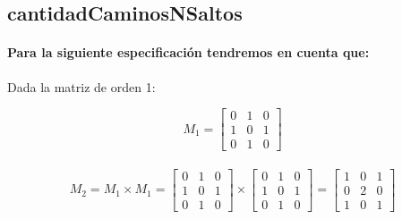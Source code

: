 \documentclass[10pt,a4paper]{article}
\begin{document}
\subsection{cantidadCaminosNSaltos}
\paragraph{Para la siguiente especificación tendremos en cuenta que:}{Dada la matriz de orden 1:}

\[
	M_{1} = \begin{bmatrix} 0 & 1 & 0 \\	1 & 0 & 1 \\	0 & 1 & 0 \end{bmatrix} \]
\\
\[
	M_{2} = M_{1} \times M_{1} =
	\begin{bmatrix}	0 & 1 & 0 \\	1 & 0 & 1 \\	0 & 1 & 0\end{bmatrix}
	\times
	\begin{bmatrix}	0 & 1 & 0 \\	1 & 0 & 1 \\	0 & 1 & 0\end{bmatrix}
	=
	\begin{bmatrix}	1 & 0 & 1 \\	0 & 2 & 0 \\	1 & 0 & 1\end{bmatrix}
\]

\\

\end{document}
